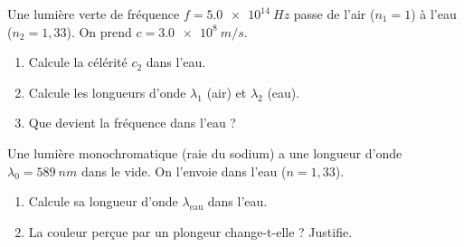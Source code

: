 \documentclass[11pt,a4paper]{article}
\begin{document}
\begin{exo}
Une lumière verte de fréquence $f=\qty{5.0e14}{Hz}$ passe de l'air ($n_1=1$) à l'eau ($n_2=1{,}33$).
On prend $c=\qty{3.0e8}{m/s}$.
\begin{enumerate}[label=\alph*)]
  \item Calcule la célérité $c_2$ dans l'eau.
  \item Calcule les longueurs d'onde $\lambda_1$ (air) et $\lambda_2$ (eau).
  \item Que devient la fréquence dans l'eau ?
\end{enumerate}
\end{exo}

\begin{exo}
Une lumière monochromatique (raie du sodium) a une longueur d'onde $\lambda_0=\qty{589}{nm}$ dans le
vide. On l'envoie dans l'eau ($n=1{,}33$).
\begin{enumerate}[label=\alph*)]
  \item Calcule sa longueur d'onde $\lambda_{\text{eau}}$ dans l'eau.
  \item La couleur perçue par un plongeur change-t-elle ? Justifie.
\end{enumerate}
\end{exo}
\end{document}
